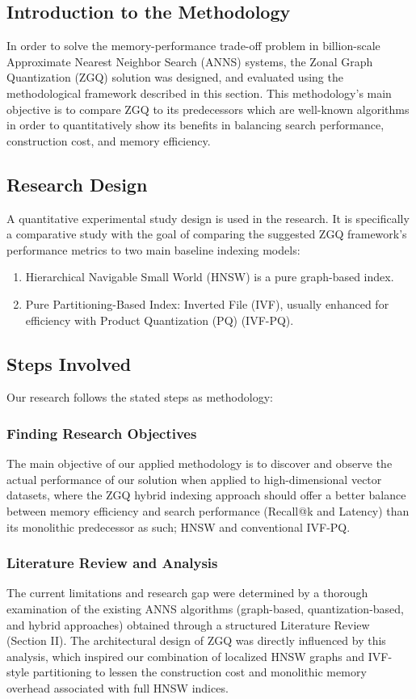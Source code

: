 \documentclass[conference]{IEEEtran}
\begin{document}
\subsection{Introduction to the Methodology}
In order to solve the memory-performance trade-off problem in billion-scale Approximate Nearest Neighbor Search (ANNS) systems, the Zonal Graph Quantization (ZGQ) solution was designed, and evaluated using the methodological framework described in this section. This methodology's main objective is to compare ZGQ to its predecessors which are well-known algorithms in order to quantitatively show its benefits in balancing search performance, construction cost, and memory efficiency.

\subsection{Research Design}
A quantitative experimental study design is used in the research. It is specifically a comparative study with the goal of comparing the suggested ZGQ framework's performance metrics to two main baseline indexing models:

\begin{enumerate}
\item Hierarchical Navigable Small World (HNSW) is a pure graph-based index.
\item Pure Partitioning-Based Index: Inverted File (IVF), usually enhanced for efficiency with Product Quantization (PQ) (IVF-PQ).
\end{enumerate}

\subsection{Steps Involved}
Our research follows the stated steps as methodology:

\subsubsection{Finding Research Objectives}
The main objective of our applied methodology is to discover and observe the actual performance of our solution when applied to high-dimensional vector datasets, where the ZGQ hybrid indexing approach should offer a better balance between memory efficiency and search performance (Recall@k and Latency) than its monolithic predecessor as such; HNSW and conventional IVF-PQ.

\subsubsection{Literature Review and Analysis}
The current limitations and research gap were determined by a thorough examination of the existing ANNS algorithms (graph-based, quantization-based, and hybrid approaches) obtained through a structured Literature Review (Section II). The architectural design of ZGQ was directly influenced by this analysis, which inspired our combination of localized HNSW graphs and IVF-style partitioning to lessen the construction cost and monolithic memory overhead associated with full HNSW indices.
\end{document}
